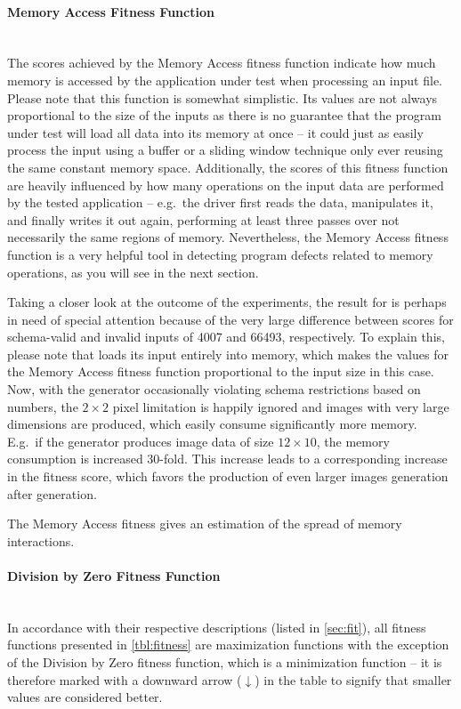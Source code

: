 \paragraph{Memory Access Fitness Function} ~\\
The scores achieved by the Memory Access fitness function indicate how much memory is accessed by the
application under test when processing an input file. Please note that this function is somewhat simplistic.
Its values are not always proportional to the size of the inputs as there is no guarantee that the program
under test will load all data into its memory at once -- it could just as easily process the input using a
buffer or a sliding window technique only ever reusing the same constant memory space.
Additionally, the scores of this fitness function are heavily influenced by how many operations on the input
data are performed by the tested application -- e.g.\ the \libpng driver first reads the data, manipulates
it, and finally writes it out again, performing at least three passes over not necessarily the same regions of
memory. Nevertheless, the Memory Access fitness function is a very helpful tool in detecting program defects
related to memory operations, as you will see in the next section. 

Taking a closer look at the outcome of the experiments, the result for \libpng is perhaps in need of special
attention because of the very large difference between scores for schema-valid and invalid inputs of 4007 and
66493, respectively. To explain this, please note that \libpng loads its input entirely into memory, which
makes the values for the Memory Access fitness function proportional to the input size in this case. Now, with
the generator occasionally violating schema restrictions based on numbers, the $2\times 2$ pixel limitation is
happily ignored and images with very large dimensions are produced, which easily consume significantly more
memory. E.g.\ if the generator produces image data of size $12 \times 10$, the memory consumption is increased
30-fold. This increase leads to a corresponding increase in the fitness score, which favors the production
of even larger images generation after generation.

\begin{mdframed}
\centering
The Memory Access fitness gives an estimation of the spread of memory interactions.
\end{mdframed}

\paragraph{Division by Zero Fitness Function} ~\\
In accordance with their respective descriptions (listed in \cref{sec:fit}), all fitness functions
presented in \cref{tbl:fitness} are maximization functions with the exception of the Division by Zero fitness
function, which is a minimization function -- it is therefore marked with a downward arrow ($\downarrow$) in the
table to signify that smaller values are considered better.

